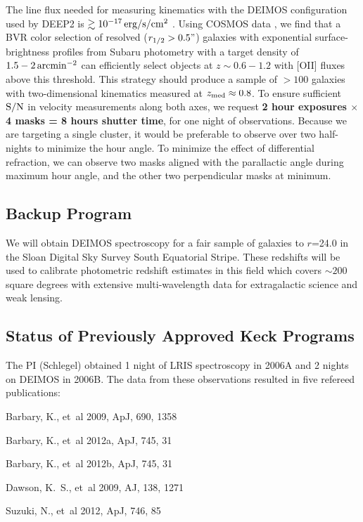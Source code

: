 \documentclass[12pt]{article}
\begin{document}
The line flux needed for measuring kinematics with the DEIMOS configuration used by DEEP2 is $\gtrsim10^{-17}\,{\rm erg/s/cm^2}$ \citep{Kassin2012}. Using COSMOS data \citep{Jouvel2009}, we find that a BVR color selection of resolved ($r_{1/2}>0.5"$) galaxies with exponential surface-brightness profiles from Subaru photometry with a target density of $1.5-2\,{\rm arcmin^{-2}}$ can efficiently select objects at $z\sim0.6-1.2$ with [OII] fluxes above this threshold. This strategy should produce a sample of $>100$ galaxies with two-dimensional kinematics measured at $z_{\rm med}\approx0.8$. To ensure sufficient ${\rm S/N}$ in velocity measurements along both axes, we request \textbf{2 hour exposures $\times$ 4 masks = 8 hours shutter time}, for one night of observations. Because we are targeting a single cluster, it would be preferable to observe over two half-nights to minimize the hour angle. To minimize the effect of differential refraction, we can observe two masks aligned with the parallactic angle during maximum hour angle, and the other two perpendicular masks at minimum.

\subsection{Backup Program}

We will obtain DEIMOS spectroscopy for a fair sample of galaxies to $r$=24.0 in the Sloan Digital Sky Survey South Equatorial Stripe. These redshifts will be used to calibrate photometric redshift estimates in this field which covers $\sim200$ square degrees with extensive multi-wavelength data for extragalactic science and weak lensing.

\subsection{Status of Previously Approved Keck Programs}
The PI (Schlegel) obtained 1 night of LRIS spectroscopy in 2006A and 2 nights on DEIMOS in 2006B. The data from these observations resulted in five refereed publications:

{\small
\begin{description}
  \item {Barbary}, K., {et~al} 2009, ApJ, 690, 1358
  \item {Barbary}, K., {et~al} 2012a, ApJ, 745, 31
  \item {Barbary}, K., {et~al} 2012b, ApJ, 745, 31
  \item {Dawson}, K.~S., {et~al} 2009, AJ,  138, 1271
  \item {Suzuki}, N., {et~al} 2012, ApJ, 746, 85
\end{description}
}
\end{document}
